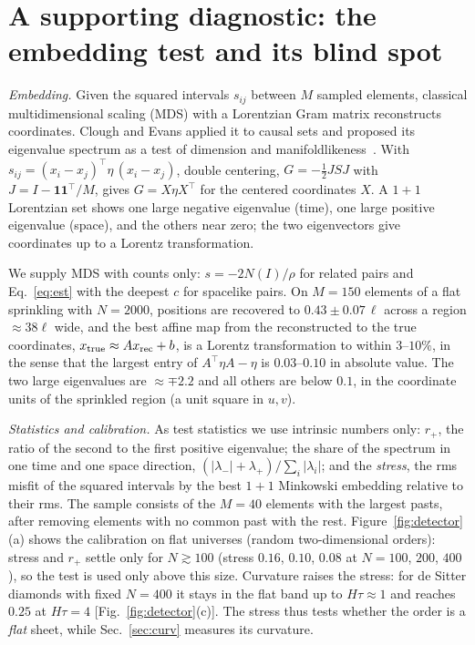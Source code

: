 \documentclass[prd,twocolumn,superscriptaddress,nofootinbib,amsmath,amssymb,floatfix]{revtex4-2}
\begin{document}
\section{A supporting diagnostic: the embedding test and its blind spot}\label{sec:embed}
\emph{Embedding.} Given the squared intervals $s_{ij}$ between $M$ sampled elements, classical multidimensional scaling (MDS) with a Lorentzian Gram matrix reconstructs coordinates. Clough and Evans applied it to causal sets and proposed its eigenvalue spectrum as a test of dimension and manifoldlikeness~\cite{CloughEvans16,Clough17}. With $s_{ij}=(x_i-x_j)^{\top}\eta\,(x_i-x_j)$, double centering, $G=-\tfrac12JSJ$ with $J=I-\mathbf1\mathbf1^{\top}/M$, gives $G=X\eta X^{\top}$ for the centered coordinates $X$. A $1+1$ Lorentzian set shows one large negative eigenvalue (time), one large positive eigenvalue (space), and the others near zero; the two eigenvectors give coordinates up to a Lorentz transformation.

We supply MDS with counts only: $s=-2N(I)/\rho$ for related pairs and Eq.~\eqref{eq:est} with the deepest $c$ for spacelike pairs. On $M=150$ elements of a flat sprinkling with $N=2000$, positions are recovered to $0.43\pm0.07\,\ell$ across a region $\approx38\ell$ wide, and the best affine map from the reconstructed to the true coordinates, $x_{\rm true}\approx Ax_{\rm rec}+b$, is a Lorentz transformation to within $3$--$10\%$, in the sense that the largest entry of $A^{\top}\eta A-\eta$ is $0.03$--$0.10$ in absolute value. The two large eigenvalues are $\approx\mp2.2$ and all others are below $0.1$, in the coordinate units of the sprinkled region (a unit square in $u,v$).

\emph{Statistics and calibration.} As test statistics we use intrinsic numbers only: $r_+$, the ratio of the second to the first positive eigenvalue; the share of the spectrum in one time and one space direction, $(|\lambda_-|+\lambda_+)/\sum_i|\lambda_i|$; and the \emph{stress}, the rms misfit of the squared intervals by the best $1+1$ Minkowski embedding relative to their rms. The sample consists of the $M=40$ elements with the largest pasts, after removing elements with no common past with the rest. Figure~\ref{fig:detector}(a) shows the calibration on flat universes (random two-dimensional orders): stress and $r_+$ settle only for $N\gtrsim100$ (stress $0.16$, $0.10$, $0.08$ at $N=100$, $200$, $400$), so the test is used only above this size. Curvature raises the stress: for de Sitter diamonds with fixed $N=400$ it stays in the flat band up to $H\tau\approx1$ and reaches $0.25$ at $H\tau=4$ [Fig.~\ref{fig:detector}(c)]. The stress thus tests whether the order is a \emph{flat} sheet, while Sec.~\ref{sec:curv} measures its curvature.
\end{document}
